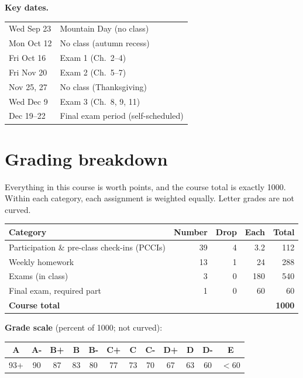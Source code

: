 \medskip
\textbf{Key dates.}
\begin{tabular}[t]{@{}ll@{}}
Wed Sep 23  & Mountain Day (no class)\\
Mon Oct 12  & No class (autumn recess)\\
Fri Oct 16  & Exam 1 (Ch.\ 2--4)\\
Fri Nov 20  & Exam 2 (Ch.\ 5--7)\\
Nov 25, 27  & No class (Thanksgiving)\\
Wed Dec 9   & Exam 3 (Ch.\ 8, 9, 11)\\
Dec 19--22  & Final exam period (self-scheduled)\\
\end{tabular}


\bigskip

\section{Grading breakdown}
%
Everything in this course is worth points, and the course total is
exactly 1000. Within each category, each assignment is weighted equally.
Letter grades are not curved.

\medskip
\begin{tabular}[t]{@{}lrrrr@{}}
\toprule
\textbf{Category} & \textbf{Number} & \textbf{Drop} & \textbf{Each} & \textbf{Total}\\
\midrule
Participation \& pre-class check-ins (PCCIs) & 39 & 4 & 3.2 & 112\\
Weekly homework & 13 & 1 & 24 & 288\\
Exams (in class) & 3 & 0 & 180 & 540\\
Final exam, required part & 1 & 0 & 60 & 60\\
\midrule
\textbf{Course total} & & & & \textbf{1000}\\
\bottomrule
\end{tabular}

\medskip
\textbf{Grade scale} (percent of 1000; not curved):

\medskip
\begin{tabular}[t]{@{}*{12}{c}@{}}
\toprule
A & A- & B+ & B & B- & C+ & C & C- & D+ & D & D- & E\\
\midrule
93+ & 90 & 87 & 83 & 80 & 77 & 73 & 70 & 67 & 63 & 60 & $<60$\\
\bottomrule
\end{tabular}

